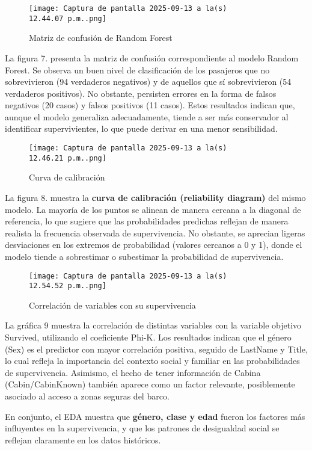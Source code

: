 \documentclass[sjournal]{IEEEtran}
\begin{document}
\begin{figure}[H]
    \centering
    \texttt{[image: Captura de pantalla 2025-09-13 a la(s) 12.44.07 p.m..png]}
    \caption{Matriz de confusión de Random Forest}
    \label{fig:placeholder}
\end{figure}
La figura 7. presenta la matriz de confusión correspondiente al modelo Random Forest. Se observa un buen nivel de clasificación de los pasajeros que no sobrevivieron (94 verdaderos negativos) y de aquellos que sí sobrevivieron (54 verdaderos positivos). No obstante, persisten errores en la forma de falsos negativos (20 casos) y falsos positivos (11 casos). Estos resultados indican que, aunque el modelo generaliza adecuadamente, tiende a ser más conservador al identificar supervivientes, lo que puede derivar en una menor sensibilidad.

\begin{figure}[H]
    \centering
    \texttt{[image: Captura de pantalla 2025-09-13 a la(s) 12.46.21 p.m..png]}
    \caption{Curva de calibración}
    \label{fig:placeholder}
\end{figure}
La figura 8. muestra la \textbf{curva de calibración (reliability diagram)} del mismo modelo. La mayoría de los puntos se alinean de manera cercana a la diagonal de referencia, lo que sugiere que las probabilidades predichas reflejan de manera realista la frecuencia observada de supervivencia. No obstante, se aprecian ligeras desviaciones en los extremos de probabilidad (valores cercanos a 0 y 1), donde el modelo tiende a sobrestimar o subestimar la probabilidad de supervivencia.
\begin{figure}[H]
    \centering
    \texttt{[image: Captura de pantalla 2025-09-13 a la(s) 12.54.52 p.m..png]}
    \caption{Correlación de variables con su supervivencia }
    \label{fig:placeholder}
\end{figure}
La gráfica 9 muestra la correlación de distintas variables con la variable objetivo Survived, utilizando el coeficiente Phi-K. Los resultados indican que el género (Sex) es el predictor con mayor correlación positiva, seguido de LastName y Title, lo cual refleja la importancia del contexto social y familiar en las probabilidades de supervivencia. Asimismo, el hecho de tener información de Cabina (Cabin/CabinKnown) también aparece como un factor relevante, posiblemente asociado al acceso a zonas seguras del barco.


En conjunto, el EDA muestra que \textbf{género, clase y edad} fueron los factores más influyentes en la supervivencia, y que los patrones de desigualdad social se reflejan claramente en los datos históricos.
\end{document}

